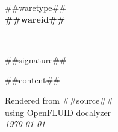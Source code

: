 \documentclass{##docstyle##}
\begin{document}
\begin{center}
  {##waretype##}\\
  \vspace{0.8em}
  {\huge \bfseries ##wareid##}\\
\end{center}\\
\vspace{1.5em}

##signature##

\vspace{1.5em}

\begin{multicols}{2}

##content##

\end{multicols}

\vspace{3em}

\begin{small}
\begin{flushright}Rendered from ##source##\\
using OpenFLUID docalyzer\\
\textit{\today}
\end{flushright}
\end{small}
\end{document}
